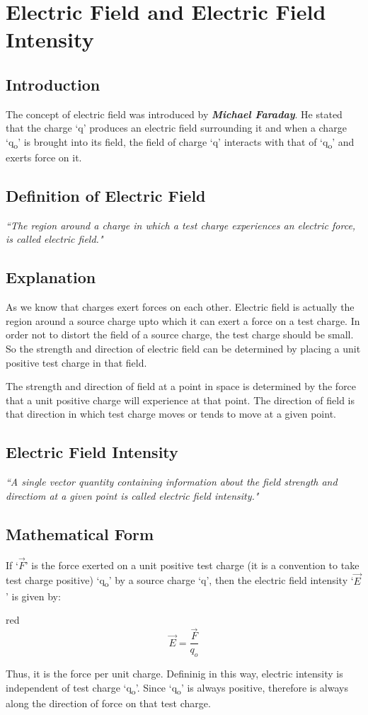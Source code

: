 \section{Electric Field and Electric Field Intensity}
\subsection*{Introduction}
The concept of electric field was introduced by \textbf{\textit{Michael Faraday}}.
He stated that the charge `q' produces an electric field surrounding it
and when a charge `q\textsubscript{o}' is brought into its field,
the field of charge `q' interacts with that of `q\textsubscript{o}' and exerts force on it.
\subsection*{Definition of Electric Field}
\textit{``The region around a charge in which a test charge
experiences an electric force, is called electric field."}
\subsection*{Explanation}
As we know that charges exert forces on each other.
Electric field is actually the region around a source charge upto
which it can exert a force on a test charge.
In order not to distort the field of a source charge,
the test charge should be small.
So the strength and direction of electric field can be determined
by placing a unit positive test charge in that field.

The strength and direction of field at a point in space is
determined by the force that a unit positive charge will
experience at that point. The direction of field is that direction
in which test charge moves or tends to move at a given point.
\subsection*{Electric Field Intensity}
\textit{``A single vector quantity containing information about the field strength and
directiom at a given point is called electric field intensity."}
\subsection*{Mathematical Form}
If `$\vec{F}$' is the force exerted on a unit positive test charge (it is a
convention to take test charge positive) `q\textsubscript{o}' by a source charge `q',
then the electric field intensity `$\vec{E}$' is given by:
\begin{mybox}{red}{}
\begin{equation}\label{eq:11.13}
  \vec{E} = \frac{\vec{F}}{q_{o}}
\end{equation}
\end{mybox}
Thus, it is the force per unit charge.
Defininig in this way, electric intensity is independent of test charge `q\textsubscript{o}'.
Since `q\textsubscript{o}' is always positive, therefore is always along the direction of
force on that test charge.

